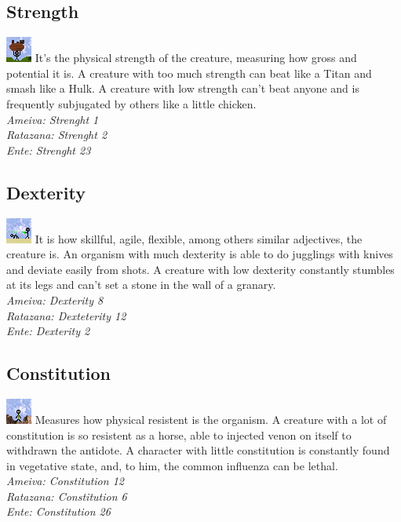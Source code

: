 \documentclass[ letterpaper,12pt]{article}
\begin{document}
\subsection{Strength}
\includegraphics{../data/skills/Img/forca.png}
It's the physical strength of the creature, measuring how gross and potential it is. A creature with too much strength can beat like a Titan and smash like a Hulk. A creature with low strength can't beat anyone and is frequently subjugated by others like a little chicken.\\
{\it Ameiva: Strenght 1\\
Ratazana: Strenght 2\\
Ente: Strenght 23\\}

\subsection{Dexterity}
\includegraphics{../data/skills/Img/destreza.png}
It is how skillful, agile, flexible, among others similar adjectives, the creature is. An organism with much dexterity is able to do jugglings with knives and deviate easily from shots. A creature with low dexterity constantly stumbles at its legs and can't set a stone in the wall of a granary.\\
{\it Ameiva: Dexterity 8\\
Ratazana: Dexteterity 12\\
Ente: Dexterity 2}

\subsection{Constitution}
\includegraphics{../data/skills/Img/constituicao.png}
Measures how physical resistent is the organism. A creature with a lot of constitution is so resistent as a horse, able to injected venon on itself to withdrawn the antidote. A character with little constitution is constantly found in vegetative state, and, to him, the common influenza can be lethal.\\
{\it Ameiva: Constitution 12\\
Ratazana: Constitution 6\\
Ente: Constitution 26}
\end{document}
